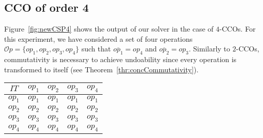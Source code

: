 \documentclass[submission,copyright,creativecommons]{eptcs}
\begin{document}
\subsection{CCO of order 4}
Figure~\ref{fig:newCSP4} shows the output of our solver in the case of $4$-CCOs. For this experiment, we have considered a set of four operations $\mathcal{O}p=\{op_1, op_2, op_3, op_4\}$ such that $\overline{op_1}=op_4$ and  $\overline{op_2}=op_3$. Similarly to $2$-CCOs, commutativity is  necessary to achieve undoability  since every operation is transformed to itself (see Theorem~\ref{thr:concCommutativity}).
\begin{table*}[htbp]  
		\centering \begin{small}  
      \begin{tabular}{|c|c|c|c|c|}
\hline
$IT$&  $op_1$ &   $op_2$& $op_3$ &   $op_4$  \\ \hline
$op_1$& $op_1$& $op_1$ &$op_1$& $op_1$\\ \hline 
$op_2$& $op_2$& $op_2$ &$op_2$& $op_2$\\ \hline 
$op_3$& $op_3$& $op_3$ &$op_3$& $op_3$\\ \hline
$op_4$& $op_4$& $op_4$ &$op_4$& $op_4$\\ \hline
\end{tabular}
     \end{small} 
   \label{fig:newCSP4}
\end{table*}
\vspace{-.4cm} 
\end{document}
